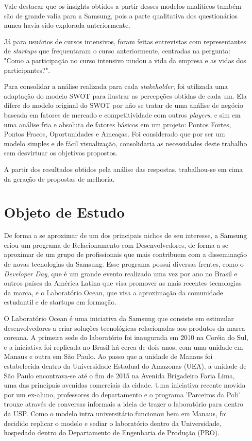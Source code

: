 Vale destacar que os insights obtidos a partir desses modelos analíticos também são de grande valia para a Samsung, pois a parte qualitativa dos questionários nunca havia sido explorada anteriormente. 

Já para usuários de cursos intensivos, foram feitas entrevistas com representantes de \textit{startups} que frequentaram o curso anteriormente, centradas na pergunta: "Como a participação no curso intensivo mudou a vida da empresa e as vidas dos participantes?".

Para consolidar a análise realizada para cada \textit{stakeholder}, foi utilizada uma adaptação do modelo SWOT para ilustrar as percepções obtidas de cada um. Ela difere do modelo original do SWOT por não se tratar de uma análise de negócio baseada em fatores de mercado e competitividade com outros \textit{players}, e sim em uma análise fria e absoluta de fatores básicos em um projeto: Pontos Fortes, Pontos Fracos, Oportunidades e Ameaças. Foi considerado que por ser um modelo simples e de fácil visualização, consolidaria as necessidades deste trabalho sem desvirtuar os objetivos propostos.

A partir dos resultados obtidos pela análise das respostas, trabalhou-se em cima da geração de propostas de melhoria.

\section{Objeto de Estudo}

De forma a se aproximar de um dos principais nichos de seu interesse, a Samsung criou um programa de Relacionamento com Desenvolvedores, de forma a se aproximar de um grupo de profissionais que mais contribuem com a disseminação de novas tecnologias da Samsung. Esse programa possui diversas frentes, como o \textit{Developer Day}, que é um grande evento realizado uma vez por ano no Brasil e outros países da América Latina que visa promover as mais recentes tecnologias da marca, e o Laboratório Ocean, que visa a aproximação da comunidade estudantil e de startups em formação.

O Laboratório Ocean é uma iniciativa da Samsung que consiste em estimular desenvolvedores a criar soluções tecnológicas relacionadas aos produtos da marca coreana. A primeira sede do laboratório foi inaugurada em 2010 na Coréia do Sul, e a iniciativa foi replicada no Brasil há cerca de dois anos, com uma unidade em Manaus e outra em São Paulo. Ao passo que a unidade de Manaus foi estabelecida dentro da Universidade Estadual do Amazonas (UEA), a unidade de São Paulo encontrava-se até o fim de 2015 na Avenida Brigadeiro Faria Lima, uma das principais avenidas comerciais da cidade. Uma iniciativa recente movida por um ex-aluno, professores do departamento e o programa 'Parceiros da Poli' trouxe através de conversas informais a ideia de trazer o laboratório para dentro da USP. Como o modelo intra universitário funcionou bem em Manaus, foi decidido replicar o modelo e sediar o laboratório dentro da Universidade, hospedado dentro do Departamento de Engenharia de Produção (PRO).

